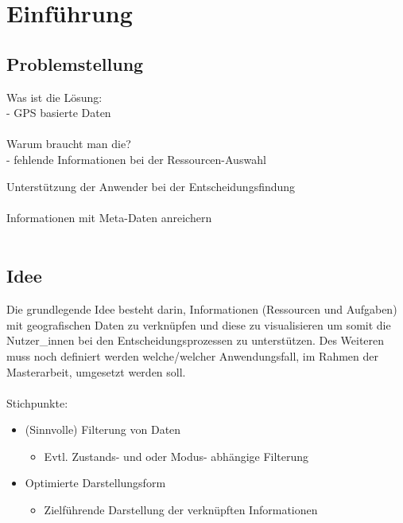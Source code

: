 \documentclass[Bachelorarbeit.tex]{subfiles}
\begin{document}
\chapter{Einführung}
\label{chap:einfuehrung}

\section{Problemstellung}
\label{chap:einfuehrung:sec:problemstellung}


Was ist die Lösung:\\
- GPS basierte Daten\\
\\
Warum braucht man die?\\
- fehlende Informationen bei der Ressourcen-Auswahl


Unterstützung der Anwender bei der Entscheidungsfindung \\
\\
Informationen mit Meta-Daten anreichern\\
\\


\section{Idee}
\label{chap:einfuehrung:sec:idee}

Die grundlegende Idee besteht darin, Informationen (Ressourcen und Aufgaben) mit geografischen Daten zu verknüpfen und diese zu visualisieren um somit die Nutzer\_innen bei den Entscheidungsprozessen zu unterstützen. Des Weiteren muss noch definiert werden welche/welcher Anwendungsfall, im Rahmen der Masterarbeit, umgesetzt werden soll.\\
\\
Stichpunkte:
\begin{itemize}
\item (Sinnvolle) Filterung von Daten
\begin{itemize}
	\item Evtl. Zustands- und oder Modus- abhängige Filterung
\end{itemize}
\item Optimierte Darstellungsform
\begin{itemize}
	\item Zielführende Darstellung der verknüpften Informationen
\end{itemize}
\end{itemize}
\end{document}
